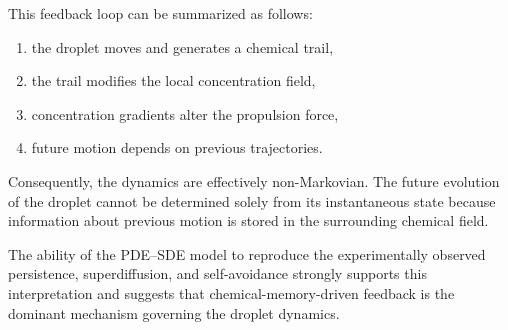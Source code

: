 This feedback loop can be summarized as follows:

\begin{enumerate}
\item the droplet moves and generates a chemical trail,
\item the trail modifies the local concentration field,
\item concentration gradients alter the propulsion force,
\item future motion depends on previous trajectories.
\end{enumerate}

Consequently, the dynamics are effectively non-Markovian. The future evolution of the droplet cannot be determined solely from its instantaneous state because information about previous motion is stored in the surrounding chemical field.

The ability of the PDE--SDE model to reproduce the experimentally observed persistence, superdiffusion, and self-avoidance strongly supports this interpretation and suggests that chemical-memory-driven feedback is the dominant mechanism governing the droplet dynamics.
